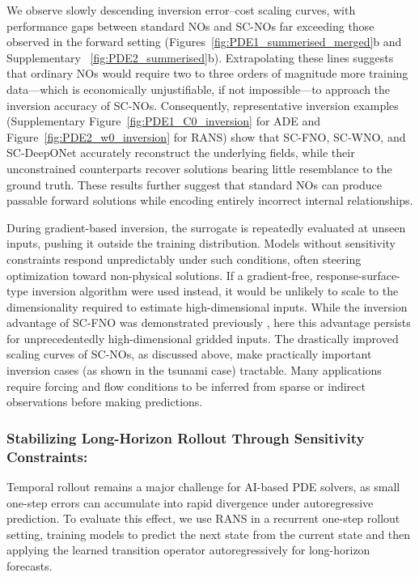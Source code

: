 We observe slowly descending inversion error--cost scaling curves, with performance gaps between standard NOs and SC-NOs far exceeding those observed in the forward setting (Figures~\ref{fig:PDE1_summerised_merged}b and Supplementary ~\ref{fig:PDE2_summerised}b). Extrapolating these lines suggests that ordinary NOs would require two to three orders of magnitude more training data—which is economically unjustifiable, if not impossible—to approach the inversion accuracy of SC-NOs. Consequently, representative inversion examples (Supplementary Figure~\ref{fig:PDE1_C0_inversion} for ADE and Figure~\ref{fig:PDE2_w0_inversion} for RANS) show that SC-FNO, SC-WNO, and SC-DeepONet accurately reconstruct the underlying fields, while their unconstrained counterparts recover solutions bearing little resemblance to the ground truth. These results further suggest that standard NOs can produce passable forward solutions while encoding entirely incorrect internal relationships.

During gradient-based inversion, the surrogate is repeatedly evaluated at unseen inputs, pushing it outside the training distribution. Models without sensitivity constraints respond unpredictably under such conditions, often steering optimization toward non-physical solutions. If a gradient-free, response-surface-type inversion algorithm were used instead, it would be unlikely to scale to the dimensionality required to estimate high-dimensional inputs. While the inversion advantage of SC-FNO was demonstrated previously \citep{behroozi2025sensitivity}, here this advantage persists for unprecedentedly high-dimensional gridded inputs. The drastically improved scaling curves of SC-NOs, as discussed above, make practically important inversion cases (as shown in the tsunami case) tractable. Many applications require forcing and flow conditions to be inferred from sparse or indirect observations before making predictions.


\subsubsection{Stabilizing Long-Horizon Rollout Through Sensitivity Constraints:}
Temporal rollout remains a major challenge for AI-based PDE solvers, as small one-step errors can accumulate into rapid divergence under autoregressive prediction. To evaluate this effect, we use RANS in a recurrent one-step rollout setting, training models to predict the next state from the current state and then applying the learned transition operator autoregressively for long-horizon forecasts.

